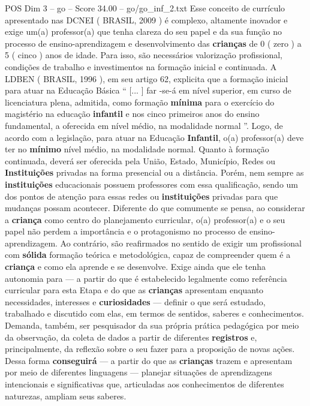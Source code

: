 \begin{textsample}{POS Dim 3 – go – Score 34.00 – go/go\_inf\_2.txt}
Esse conceito de currículo apresentado nas DCNEI ( BRASIL, 2009 ) é complexo, altamente inovador e exige um(a) professor(a) que tenha clareza do seu papel e da sua função no processo de ensino-aprendizagem e desenvolvimento das \textbf{crianças} de 0 ( zero ) a 5 ( cinco ) anos de idade.
Para isso, são necessários valorização profissional, condições de trabalho e investimentos na formação inicial e continuada.
A LDBEN ( BRASIL, 1996 ), em seu artigo 62, explicita que a formação inicial para atuar na Educação Básica “ [... ] far -se-á em nível superior, em curso de licenciatura plena, admitida, como formação \textbf{mínima} para o exercício do magistério na educação \textbf{infantil} e nos cinco primeiros anos do ensino fundamental, a oferecida em nível médio, na modalidade normal ”.
Logo, de acordo com a legislação, para atuar na Educação \textbf{Infantil}, o(a) professor(a) deve ter no \textbf{mínimo} nível médio, na modalidade normal.
Quanto à formação continuada, deverá ser oferecida pela União, Estado, Município, Redes ou \textbf{Instituições} privadas na forma presencial ou a distância.
Porém, nem sempre as \textbf{instituições} educacionais possuem professores com essa qualificação, sendo um dos pontos de atenção para essas redes ou \textbf{instituições} privadas para que mudanças possam acontecer.
Diferente do que comumente se pensa, ao considerar a \textbf{criança} como centro do planejamento curricular, o(a) professor(a) e o seu papel não perdem a importância e o protagonismo no processo de ensino-aprendizagem.
Ao contrário, são reafirmados no sentido de exigir um profissional com \textbf{sólida} formação teórica e metodológica, capaz de compreender quem é a \textbf{criança} e como ela aprende e se desenvolve.
Exige ainda que ele tenha autonomia para — a partir do que é estabelecido legalmente como referência curricular para esta Etapa e do que as \textbf{crianças} apresentam enquanto necessidades, interesses e \textbf{curiosidades} — definir o que será estudado, trabalhado e discutido com elas, em termos de sentidos, saberes e conhecimentos.
Demanda, também, ser pesquisador da sua própria prática pedagógica por meio da observação, da coleta de dados a partir de diferentes \textbf{registros} e, principalmente, da reflexão sobre o seu fazer para a proposição de novas ações.
Dessa forma \textbf{conseguirá} — a partir do que as \textbf{crianças} trazem e apresentam por meio de diferentes linguagens — planejar situações de aprendizagens intencionais e significativas que, articuladas aos conhecimentos de diferentes naturezas, ampliam seus saberes.

\end{textsample}

